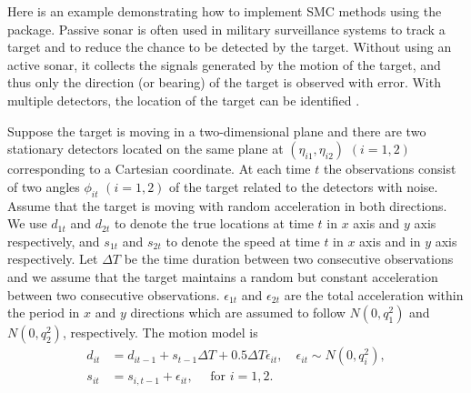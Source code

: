 Here is an example demonstrating how to implement SMC methods using the  package. Passive sonar is often used in military surveillance systems to track a target and to reduce the chance to be detected by the target. Without using an active sonar, it collects the signals generated by the motion of the target, and thus only the direction (or bearing) of the target is observed with error. With multiple detectors, the location of the target can be identified \citep{peach1995,kronhamn1998,arulampalam2004,tsay2018}. 

Suppose the target is moving in a two-dimensional plane and there are two stationary detectors located on the same plane at $(\eta_{i1},\eta_{i2})$ $(i=1,2)$ corresponding to a Cartesian coordinate. At each time $t$ the observations consist of two angles $\phi_{it}$ $(i=1,2)$ of the target related to the detectors with noise. Assume that the target is moving with random acceleration in both directions. We use $d_{1t}$ and $d_{2t}$ to denote the true locations at time $t$ in $x$ axis and $y$ axis respectively, and $s_{1t}$ and $s_{2t}$ to denote the speed at time $t$ in $x$ axis and in $y$ axis respectively. Let $\Delta T$ be the time duration between two consecutive observations and we assume that the target maintains a random but constant acceleration between two consecutive observations. $\epsilon_{1t}$ and $\epsilon_{2t}$ are the total acceleration within the period in $x$ and $y$ directions which are assumed to follow $N(0,q_1^2)$ and $N(0,q_2^2)$, respectively. The motion model is
\begin{align*}
d_{it}&=d_{it-1}+s_{t-1}\Delta T +0.5 \Delta T \epsilon_{it}, \quad \epsilon_{it} \sim N(0,q_i^2),\\
s_{it}&=s_{i,t-1}+\epsilon_{it}, \quad \mbox{ for } i=1,2.
\end{align*}

